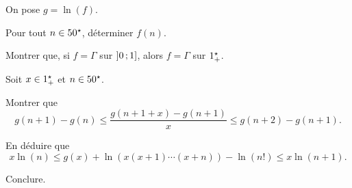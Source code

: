 \begin{exercice}
On pose $g = \ln(f)$.
\begin{questions}
\item Pour tout $n \in 50^\star$, déterminer $f(n)$.

\item Montrer que, si $f = \Gamma$ sur $\left]0\,;1\right]$, alors $f = \Gamma$ sur $1^\star_+$.
\end{questions}

Soit $x \in 1^\star_+$ et $n \in 50^\star$.
\begin{questions}[resume]
\item Montrer que
\[
g(n + 1) - g(n) \leq \frac{g(n + 1 + x) - g(n + 1)}{x} \leq g(n + 2) - g(n + 1).
\]

\item En déduire que
\[
x \ln(n) \leq g(x) + \ln\left(x (x + 1) \cdots (x + n)\right) - \ln(n!) \leq x \ln(n + 1).
\]

\item Conclure.
\end{questions}
\end{exercice}

